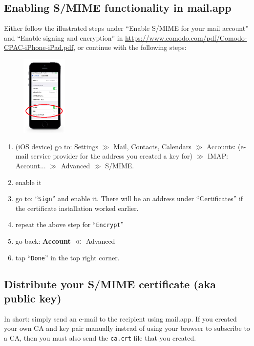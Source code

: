 \documentclass[pdftex,12pt,titlepage=false]{scrartcl}
\begin{document}
\subsection{Enabling S/MIME functionality in mail.app}\label{smime_enable}
Either follow the illustrated steps under ``Enable S/MIME for your
mail account'' and ``Enable signing and encryption'' in
\url{https://www.comodo.com/pdf/Comodo-CPAC-iPhone-iPad.pdf}, or
continue with the following steps:\\[-2em]%
\begin{figure}%
  \includegraphics[width=0.2\textwidth]{images/mailapp_smime_settings_indicated.png}
\end{figure}%
\begin{enumerate}%
\item (iOS device) go to: Settings $\gg$ Mail, Contacts, Calendars
  $\gg$ Accounts: (e-mail service provider for the address you created
  a key for) $\gg$ IMAP: Account... $\gg$ Advanced $\gg$ S/MIME.
\item enable it
\item go to: ``\verb|Sign|'' and enable it.  There will be an address under
  ``Certificates'' if the certificate installation worked earlier.
\item repeat the above step for ``\verb|Encrypt|''
\item go back: \textbf{Account} $\ll$ Advanced
\item tap ``\verb|Done|'' in the top right corner.
\end{enumerate}

\subsection{Distribute your S/MIME certificate (aka public key)}
In short: simply send an e-mail to the recipient using mail.app.  If
you created your own CA and key pair manually instead of using your
browser to subscribe to a CA, then you must also send the
\verb|ca.crt| file
that you created.\\
\end{document}
